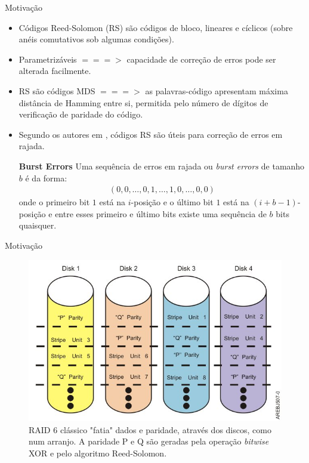   \begin{frame}{Motivação}
     \begin{itemize}
        \item Códigos Reed-Solomon (RS) são códigos de bloco, lineares e cíclicos (sobre anéis comutativos sob algumas condições).
        \item Parametrizáveis $===>$ capacidade de correção de erros pode ser alterada facilmente.
        \item RS são códigos MDS $===>$ as palavras-código apresentam máxima distância de Hamming entre si, permitida pelo número de dígitos de verificação de paridade do código.
        \item Segundo os autores em \cite{Almeida:2007,Sloane:1977}, códigos RS são úteis para correção de erros em rajada.
\begin{definition} {\bf Burst Errors}  Uma sequência de erros em rajada ou \emph{burst errors} de tamanho $b$ é da forma:
    \begin{align*}
     (0, 0, \ldots, 0, 1, \ldots , 1, 0, \ldots, 0, 0)
    \end{align*}
onde o primeiro bit $1$ está na $i$-posição e o último bit $1$ está na $(i+b-1)$-posição e entre esses primeiro e último bits existe uma sequência de $b$ bits quaisquer.
\end{definition}
     \end{itemize}
  \end{frame}

  \begin{frame}{Motivação}
   \begin{figure}[h]
     \centering
     \includegraphics[scale=.4]{raid6.jpg}
     \caption{RAID 6 clássico "fatia" dados e paridade, através dos discos, como num arranjo. A paridade P e Q são geradas pela operação \emph{bitwise} XOR e pelo algoritmo Reed-Solomon.\cite{IBMR6:2012}}
     \label{fig6:raid6}
   \end{figure}
  \end{frame}

